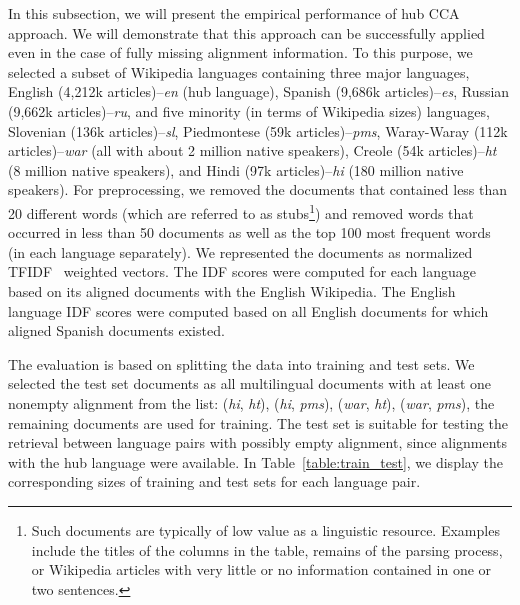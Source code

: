 In this subsection, we will present the empirical performance of hub CCA approach.
We will demonstrate that this approach can be successfully applied even in the case of
fully missing alignment information.
To this purpose, we selected a subset of Wikipedia languages containing three major languages,
English (4,212k articles)--\emph{en} (hub language), Spanish (9,686k articles)--\emph{es},
Russian (9,662k articles)--\emph{ru}, and five minority (in terms of Wikipedia sizes) languages,
Slovenian (136k articles)--\emph{sl}, Piedmontese (59k articles)--\emph{pms},
Waray-Waray (112k articles)--\emph{war} (all with about 2 million native speakers),
Creole (54k articles)--\emph{ht} (8 million native speakers), and Hindi
(97k articles)--\emph{hi} (180 million native speakers). For preprocessing, we removed the documents that contained
less than 20 different words (which are referred to as stubs\footnote{Such documents are typically of low value as a linguistic resource.
Examples include the titles of the columns in the table, remains of the parsing process,
or Wikipedia articles with very little or no information contained in one or two sentences.}) and removed words that occurred in
less than 50 documents as well as the top 100 most frequent words (in each language separately). We represented the documents as
normalized TFIDF~\cite{Salton88term-weightingapproaches} weighted vectors. The IDF scores were computed for each language based
on its aligned documents with the English Wikipedia. The English language IDF scores were computed based on all English documents
for which aligned Spanish documents existed.

The evaluation is based on splitting the data into training and test sets.
We selected the test set documents as all multilingual documents with at least one nonempty alignment
from the list: (\emph{hi}, \emph{ht}), (\emph{hi}, \emph{pms}), (\emph{war}, \emph{ht}), (\emph{war}, \emph{pms}),
the remaining documents are used for training.
The test set is suitable for testing the retrieval between language pairs with possibly empty alignment, since alignments with the hub
language were available.
In Table~\ref{table:train_test}, we display the corresponding sizes of training and test sets for each language pair.

